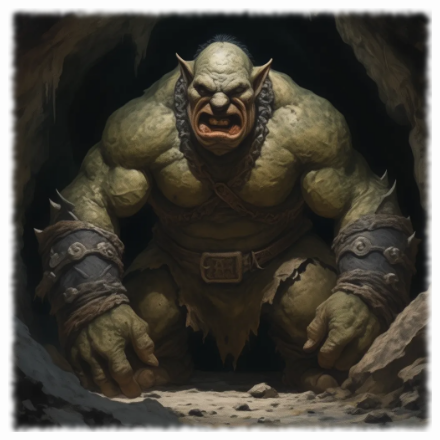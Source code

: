 

\begin{figure}[h]
\begin{center}
\includegraphics[scale=0.24]{img/ai-images/ogre-mutant.png}
\end{center}
\end{figure}
